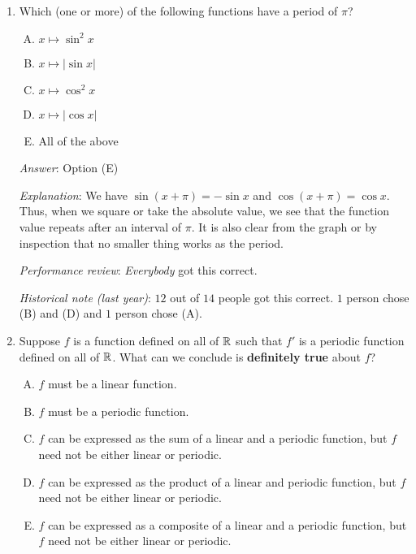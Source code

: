 \documentclass[10pt]{amsart}
\begin{document}
\begin{enumerate}
  {\em Historical note (last year)}: $7$ out of $14$ people got this
  correct. $4$ people chose (D) and $3$ people chose (E). It is likely
  that the people who chose (D) first tried and found that (A) works,
  and assumed (incorrectly) that the other options work similarly.

\item Which (one or more) of the following functions have a period of
  $\pi$?

  \begin{enumerate}[(A)]
  \item $x \mapsto \sin^2 x$
  \item $x \mapsto |\sin x|$
  \item $x \mapsto \cos^2 x$
  \item $x \mapsto |\cos x|$
  \item All of the above
  \end{enumerate}

  {\em Answer}: Option (E)

  {\em Explanation}: We have $\sin(x + \pi) = -\sin x$ and $\cos(x +
  \pi) = \cos x$. Thus, when we square or take the absolute value, we
  see that the function value repeats after an interval of $\pi$. It
  is also clear from the graph or by inspection that no smaller thing
  works as the period.

  {\em Performance review}: {\em Everybody} got this correct.

  {\em Historical note (last year)}: $12$ out of $14$ people got this
  correct. $1$ person chose (B) and (D) and $1$ person chose (A).

\item Suppose $f$ is a function defined on all of $\mathbb{R}$ such that $f'$
  is a periodic function defined on all of $\mathbb{R}$. What can we conclude
  is {\bf definitely true} about $f$?

  \begin{enumerate}[(A)]

  \item $f$ must be a linear function.
  \item $f$ must be a periodic function.
  \item $f$ can be expressed as the sum of a linear and a periodic
    function, but $f$ need not be either linear or periodic.
  \item $f$ can be expressed as the product of a linear and periodic
    function, but $f$ need not be either linear or periodic.
  \item $f$ can be expressed as a composite of a linear and a periodic
    function, but $f$ need not be either linear or periodic.
  \end{enumerate}


\end{enumerate}
\end{document}

